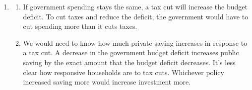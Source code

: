 \documentclass{article}
\begin{document}
\begin{enumerate}
\begin{enumerate}
	\end{enumerate}
	
\item

	\begin{enumerate}
	
	\item If government spending stays the same, a tax cut will increase the budget deficit. To cut taxes and reduce the deficit, the government would have to cut spending more than it cuts taxes.
	
	\item We would need to know how much private saving increases in response to a tax cut. A decrease in the government budget deficit increases public saving by the exact amount that the budget deficit decreases. It's less clear how responsive households are to tax cuts. Whichever policy increased saving more would increase investment more.
	
	\end{enumerate}

\end{enumerate}
\end{document}
